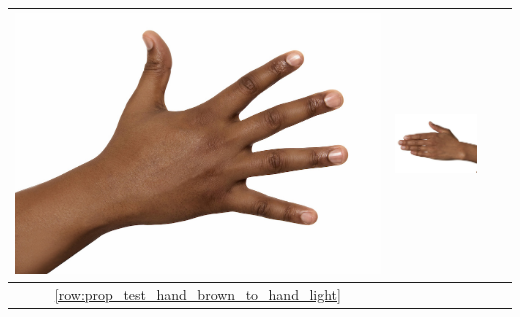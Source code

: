 \documentclass[12pt, a4paper]{article}
\begin{document}
\begin{longtable}{|c||c|c|c|}
\begin{minipage}{.29\textwidth}
    \includegraphics[width=\textwidth,height=\textheight,keepaspectratio]{../inputs/hand_dark.jpg}
  \end{minipage} & 
  \begin{minipage}{.29\textwidth}
    \includegraphics[width=\textwidth,height=\textheight,keepaspectratio]{../rc_test/outputs/20170516_proportional_test/hand_brown_to_hand_dark.jpg}
  \end{minipage} \\
\hline  \ref{row:prop_test_hand_brown_to_hand_light} &
  \begin{minipage}{.29\textwidth}

\end{minipage}
\end{longtable}
\end{document}
